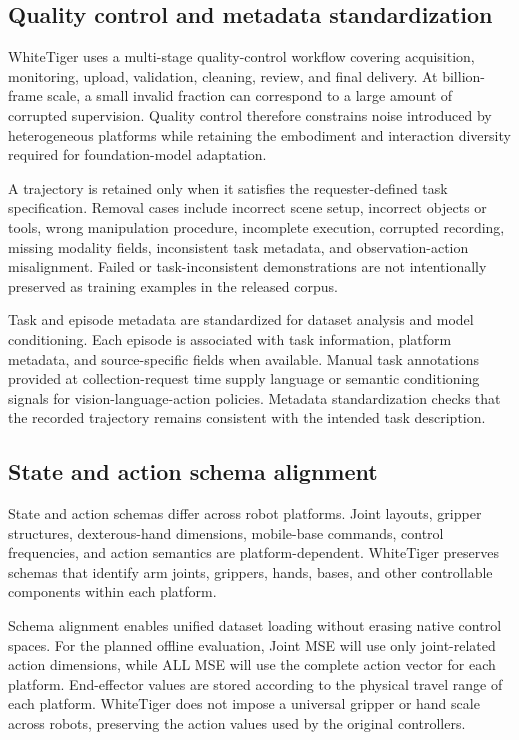 \subsection{Quality control and metadata standardization}

WhiteTiger uses a multi-stage quality-control workflow covering acquisition, monitoring, upload, validation, cleaning, review, and final delivery. At billion-frame scale, a small invalid fraction can correspond to a large amount of corrupted supervision. Quality control therefore constrains noise introduced by heterogeneous platforms while retaining the embodiment and interaction diversity required for foundation-model adaptation.

A trajectory is retained only when it satisfies the requester-defined task specification. Removal cases include incorrect scene setup, incorrect objects or tools, wrong manipulation procedure, incomplete execution, corrupted recording, missing modality fields, inconsistent task metadata, and observation-action misalignment. Failed or task-inconsistent demonstrations are not intentionally preserved as training examples in the released corpus.

Task and episode metadata are standardized for dataset analysis and model conditioning. Each episode is associated with task information, platform metadata, and source-specific fields when available. Manual task annotations provided at collection-request time supply language or semantic conditioning signals for vision-language-action policies. Metadata standardization checks that the recorded trajectory remains consistent with the intended task description.

\subsection{State and action schema alignment}

State and action schemas differ across robot platforms. Joint layouts, gripper structures, dexterous-hand dimensions, mobile-base commands, control frequencies, and action semantics are platform-dependent. WhiteTiger preserves schemas that identify arm joints, grippers, hands, bases, and other controllable components within each platform.

Schema alignment enables unified dataset loading without erasing native control spaces. For the planned offline evaluation, Joint MSE will use only joint-related action dimensions, while ALL MSE will use the complete action vector for each platform. End-effector values are stored according to the physical travel range of each platform. WhiteTiger does not impose a universal gripper or hand scale across robots, preserving the action values used by the original controllers.

